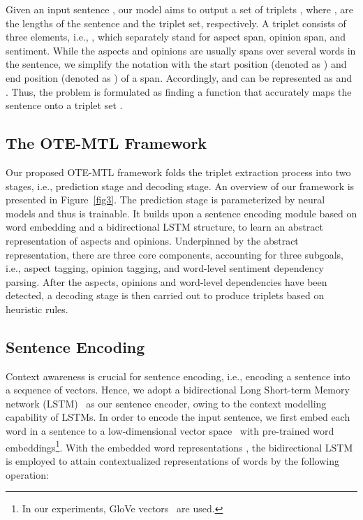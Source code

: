 \documentclass[11pt,a4paper]{article}
\begin{document}
Given an input sentence , our model aims to output a set of triplets , where ,  are the lengths of the sentence and the triplet set, respectively. A triplet  consists of three elements, i.e., , which separately stand for aspect span, opinion span, and sentiment. While the aspects and opinions are usually spans over several words in the sentence, we simplify the notation with the start position (denoted as ) and end position (denoted as ) of a span. Accordingly,  and  can be represented as  and . Thus, the problem is formulated as finding a function  that accurately maps the sentence  onto a triplet set .

\subsection{The OTE-MTL Framework}

Our proposed OTE-MTL framework folds the triplet extraction process into two stages, i.e., prediction stage and decoding stage. An overview of our framework is presented in Figure~\ref{fig3}. The prediction stage is parameterized by neural models and thus is trainable. It builds upon a sentence encoding module based on word embedding and a bidirectional LSTM structure, to learn an abstract representation of aspects and opinions. Underpinned by the abstract representation, there are three core components, accounting for three subgoals, i.e., aspect tagging, opinion tagging, and word-level sentiment dependency parsing. After the aspects, opinions and word-level dependencies have been detected, a decoding stage is then carried out to produce triplets based on heuristic rules.

\subsection{Sentence Encoding}

Context awareness is crucial for sentence encoding, i.e., encoding a sentence into a sequence of vectors. Hence, we adopt a bidirectional Long Short-term Memory network (LSTM)~\cite{hochreiter1997long} as our sentence encoder, owing to the context modelling capability of LSTMs. In order to encode the input sentence, we first embed each word in a sentence to a low-dimensional vector space~\cite{bengio2003neural} with pre-trained word embeddings\footnote{In our experiments, GloVe vectors~\cite{pennington2014glove} are used.}. With the embedded word representations , the bidirectional LSTM is employed to attain contextualized representations of words   by the following operation:
\end{document}
